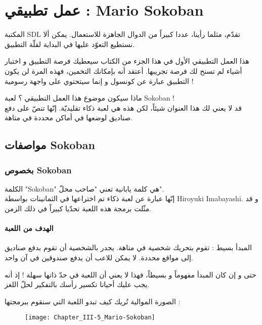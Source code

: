 \chapter{عمل تطبيقي : \textenglish{Mario Sokoban}}

المكتبة
\textenglish{SDL}
تقدّم، مثلما رأينا، عددا كبيراً من الدوال الجاهزة للاستعمال. يمكن ألا نستطيع التعوّد عليها في البداية لقلّة التطبيق.

هذا العمل التطبيقي الأول في هذا الجزء من الكتاب سيعطيك فرصة التطبيق و اختبار أشياء لم تسنح لك فرصة تجريبها.
أعتقد أنه بإمكانك التخمين، فهذه المرة لن يكون التطبيق عبارة عن كونسول و إنما سيتحتوي على واجهة رسومية !

ماذا سيكون موضوع هذا العمل التطبيقي ؟ لعبة
\textenglish{Sokoban} !\\
قد لا يعني لك هذا العنوان شيئاً، لكن هذه هي لعبة ذكاء تقليديّة. إنّها تنصّ على دفع صناديق لوضعها في أماكن محددة في متاهة.

\section{مواصفات \textenglish{Sokoban}}

\subsection{بخصوص \textenglish{Sokoban}}

الكلمة
"\textenglish{Sokoban}"
هي كلمة يابانية تعني "صاحب محلّ".\\
إنّها عبارة عن لعبة ذكاء تم اختراعها في الثمانينات بواسطة
\textenglish{Hiroyuki Imabayashi}.
و قد مثّلت برمجة هذه اللعبة تحدّيا كبيراً في ذلك الزمن.

\subsubsection{الهدف من اللعبة}

المبدأ بسيط : تقوم بتحريك شخصية في متاهة. يجدر بالشخصية أن تقوم بدفع صناديق إلى مواقع محددة. لا يمكن للاعب أن يدفع صندوقين في آن واحد.

حتى و إن كان المبدأ مفهوماً و بسيطاً، فهذا لا يعني أن اللعبة في حدّ ذاتها سهلة ! إذ أنه يجب عليك أحيانا تكسير رأسك بالتفكير لحلّ اللغز.

الصورة الموالية تُريك كيف تبدو اللعبة التي سنقوم ببرمجتها :

\begin{figure}[H]
	\centering
	\texttt{[image: Chapter\_III-5\_Mario-Sokoban]}
\end{figure}

